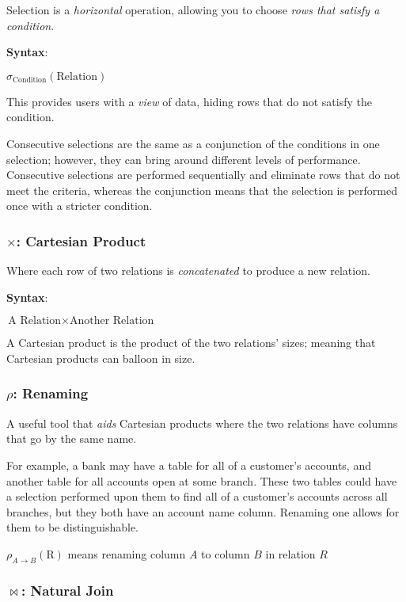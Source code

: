 \documentclass{article}
\begin{document}
Selection is a \textit{horizontal} operation, allowing you to choose \textit{rows that satisfy a condition}.

\textbf{Syntax}:

$\sigma_{\text{Condition}}(\text{Relation})$

This provides users with a \textit{view} of data, hiding rows that do not satisfy the condition.

Consecutive selections are the same as a conjunction of the conditions in one selection; however, they can bring around different levels of performance. Consecutive selections are performed sequentially and eliminate rows that do not meet the criteria, whereas the conjunction means that the selection is performed once with a stricter condition.

\subsubsection*{$\times$: Cartesian Product}

Where each row of two relations is \textit{concatenated} to produce a new relation.

\textbf{Syntax}:

$\text{A Relation} \times \text{Another Relation}$

A Cartesian product is the product of the two relations' sizes; meaning that Cartesian products can balloon in size.

\subsubsection*{$\rho$: Renaming}

A useful tool that \textit{aids} Cartesian products where the two relations have columns that go by the same name.

For example, a bank may have a table for all of a customer's accounts, and another table for all accounts open at some branch. These two tables could have a selection performed upon them to find all of a customer's accounts across all branches, but they both have an account name column. Renaming one allows for them to be distinguishable.

$\rho_{A \rightarrow B}(\text{R})$ means renaming column $A$ to column $B$ in relation $R$

\subsubsection*{$\Join$: Natural Join}
\end{document}

